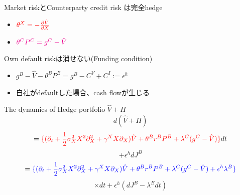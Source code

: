 \documentclass[driverfallback=dvipdfmx,cjk]{beamer}
\begin{document}
\begin{frame}
    Market riskとCounterparty credit risk は完全hedge
    \begin{itemize}
        \item $\textcolor{red}{\theta^X = -\frac{ \partial \hat{V}}{\partial X}}$
        \item $ \textcolor{magenta}{\theta^CP^C = g^C - \hat{V} }$ 
    \end{itemize}

    Own default riskは消せない(Funding condition)
    \begin{itemize}
        \item $g^B - \hat{V} -\theta^B P^B = g^B - C^V + C^I := \epsilon^h $
        \item 自社がdefaultした場合、cash flowが生じる
    \end{itemize}
The dynamics of Hedge portfolio $\hat{V} + \Pi$
$$ d (\hat{V} + \Pi)$$ 
$$=\textcolor{red}{\{ (\partial_t + \frac{1}{2}\sigma_X^2 X^2 \partial^2_{X}+ \gamma^X X \partial_{X}) \hat{V} + \theta^B r^B P^B + \lambda^C(g^C-\hat{V})  \}}dt$$ 
$$+ \epsilon^h dJ^B $$
$$=\textcolor{blue}{\{ (\partial_t + \frac{1}{2}\sigma_X^2 X^2 \partial^2_{X}+ \gamma^X X \partial_{X}) \hat{V} + \theta^B r^B P^B + \lambda^C(g^C-\hat{V})+\epsilon^h \lambda^B\}}$$ $$\times dt+ \epsilon^h  (dJ^B - \lambda^B dt) $$
\end{frame}
\end{document}
